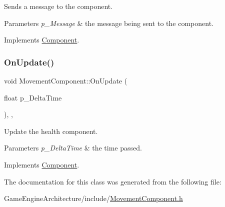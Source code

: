 Sends a message to the component. 


\begin{DoxyParams}{Parameters}
{\em p\+\_\+\+Message} & the message being sent to the component. \\
\hline
\end{DoxyParams}


Implements \mbox{\hyperlink{class_component_a1cd106256bf1791f9c6ab347776c7788}{Component}}.

\mbox{\label{class_movement_component_aa7d58780fe672dc910896c53aa4da7fd}} 
\subsubsection{\texorpdfstring{OnUpdate()}{OnUpdate()}}
{\footnotesize\ttfamily void Movement\+Component\+::\+On\+Update (\begin{DoxyParamCaption}\item[{float}]{p\+\_\+\+Delta\+Time }\end{DoxyParamCaption})\hspace{0.3cm}{\ttfamily [inline]}, {\ttfamily [override]}, {\ttfamily [virtual]}}



Update the health component. 


\begin{DoxyParams}{Parameters}
{\em p\+\_\+\+Delta\+Time} & the time passed. \\
\hline
\end{DoxyParams}


Implements \mbox{\hyperlink{class_component_ac080e9fa054949464c796b65a4b26b93}{Component}}.



The documentation for this class was generated from the following file\+:\begin{DoxyCompactItemize}
\item 
Game\+Engine\+Architecture/include/\mbox{\hyperlink{_movement_component_8h}{Movement\+Component.\+h}}\end{DoxyCompactItemize}
